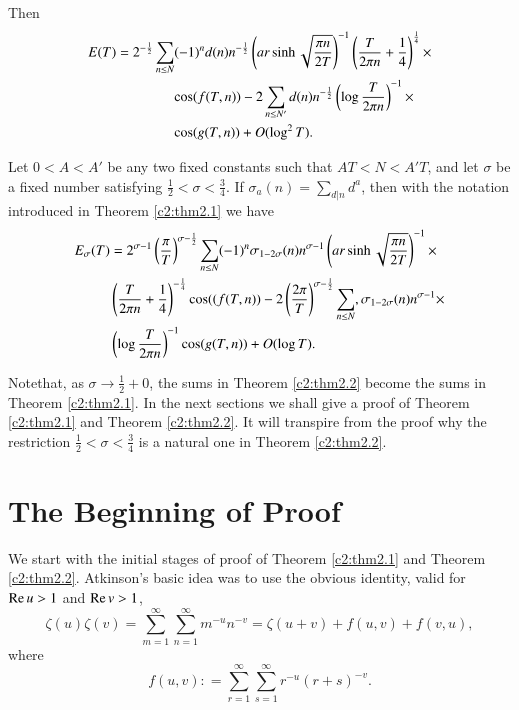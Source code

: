 Then 
\begin{align}
E(T) &= 2^{- \frac{1}{2}}\sum_{n \leq N} (-1)^n d (n) n^{-\frac{1}{2}}
\left(ar \sinh \sqrt{\frac{\pi n}{2T}}\right)^{-1} \left(\frac{T}{2
  \pi n} + \frac{1}{4} \right)^{\frac{1}{4}}\times \notag\\
& \qquad\qquad \cos (f (T, n)) - 2 \sum_{n \leq N'} d(n) n^{- \frac{1}{2}} \left(\log
\frac{T}{2 \pi n}\right)^{-1}\times\notag\\ 
&\qquad\qquad \cos (g(T, n)) + O (\log^2 T).\label{c2:eq2.5}
\end{align}

\begin{thm}\label{c2:thm2.2}
  Let $0 < A < A'$ be any two fixed constants such that $AT < N <
  A'T$, and let $\sigma$ be a fixed number satisfying $\frac{1}{2} <
  \sigma < \frac{3}{4}$. If $\sigma_a (n) = \sum\limits_{d|n} d^a$, then with
  the notation introduced in Theorem \ref{c2:thm2.1} we have
  \begin{align}
    E_\sigma (T) & = 2^{\sigma-1} \left( \frac{\pi}{T}\right)^{\sigma -
      \frac{1}{2}} \sum_{n \leq N} (-1)^n \sigma_{1-2 \sigma}(n)
    n^{\sigma-1} \left(ar \sinh \sqrt{\frac{\pi n}{2 T}}\right)^{-1}\times\notag\\
     &  \left(\frac{T}{2 \pi n} + \frac{1}{4} \right)^{-\frac{1}{4}}
      \cos (( f (T, n)) - 2 \left(\frac{2 \pi}{T}\right)^{\sigma -
        \frac{1}{2}} \sum_{n \leq N}, \sigma_{1- 2 \sigma} (n)
      n^{\sigma-1}\times\label{c2:eq2.6}\\ 
      & \left( \log \frac{T}{2 \pi n}\right)^{-1} \cos (g
      (T, n))+ O(\log T).\notag
  \end{align}
\end{thm}

Note\pageoriginale that, as $\sigma \to \frac{1}{2} +0$, the sums in
Theorem \ref{c2:thm2.2} become the sums in Theorem \ref{c2:thm2.1}. In
the next sections we shall give a proof of Theorem \ref{c2:thm2.1} and
Theorem \ref{c2:thm2.2}. It will transpire from the proof why the
restriction $\frac{1}{2} < \sigma < \frac{3}{4}$ is a natural one in
Theorem \ref{c2:thm2.2}.

\section{The Beginning of Proof}\label{c2:sec2.2}

We start with the initial stages of proof of Theorem \ref{c2:thm2.1}
and Theorem \ref{c2:thm2.2}. Atkinson's basic idea was to use the
obvious identity, valid for $\operatorname{Re} u> 1$ and $\operatorname{Re} v > 1$,
\begin{equation}
  \zeta (u) \zeta (v) = \sum^\infty_{m=1} \sum^\infty_{n=1} m^{-u}
  n^{-v}= \zeta (u+v) + f(u, v)+ f(v, u),\label{c2:eq2.7}
\end{equation}
where
\begin{equation}
  f(u, v) : = \sum^\infty_{r=1} \sum^\infty_{s=1}r^{-u} (r+
  s)^{-v}.\label{c2:eq2.8} 
\end{equation}

